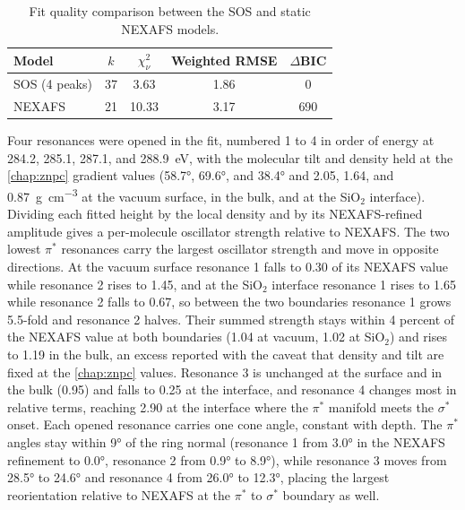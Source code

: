 \begin{table}
  \centering
  \caption{Fit quality comparison between the SOS and static NEXAFS models.}\label{tab:5.2}
  \begin{tabular}{l S[table-format=2.0] S[table-format=2.2] S[table-format=1.2] S[table-format=3.0]}
    \toprule
    Model & {\(k\)} & {\(\chi^{2}_{\nu}\)} & {Weighted RMSE} & {\(\Delta\)BIC} \\
    \midrule
    SOS (4 peaks) & 37 & 3.63 & 1.86 & 0 \\
    NEXAFS & 21 & 10.33 & 3.17 & 690 \\
    \bottomrule
  \end{tabular}
\end{table}

Four resonances were opened in the fit, numbered 1 to 4 in order of energy at 284.2, 285.1, 287.1, and \qty{288.9}{eV}, with the molecular tilt and density held at the \cref{chap:znpc} gradient values (\ang{58.7}, \ang{69.6}, and \ang{38.4} and 2.05, 1.64, and \qty{0.87}{g.cm^{-3}} at the vacuum surface, in the bulk, and at the SiO\(_{2}\) interface). Dividing each fitted height by the local density and by its NEXAFS-refined amplitude gives a per-molecule oscillator strength relative to NEXAFS. The two lowest \(\pi^{*}\) resonances carry the largest oscillator strength and move in opposite directions. At the vacuum surface resonance 1 falls to 0.30 of its NEXAFS value while resonance 2 rises to 1.45, and at the SiO\(_{2}\) interface resonance 1 rises to 1.65 while resonance 2 falls to 0.67, so between the two boundaries resonance 1 grows 5.5-fold and resonance 2 halves. Their summed strength stays within 4 percent of the NEXAFS value at both boundaries (1.04 at vacuum, 1.02 at SiO\(_{2}\)) and rises to 1.19 in the bulk, an excess reported with the caveat that density and tilt are fixed at the \cref{chap:znpc} values. Resonance 3 is unchanged at the surface and in the bulk (0.95) and falls to 0.25 at the interface, and resonance 4 changes most in relative terms, reaching 2.90 at the interface where the \(\pi^{*}\) manifold meets the \(\sigma^{*}\) onset. Each opened resonance carries one cone angle, constant with depth. The \(\pi^{*}\) angles stay within \ang{9} of the ring normal (resonance 1 from \ang{3.0} in the NEXAFS refinement to \ang{0.0}, resonance 2 from \ang{0.9} to \ang{8.9}), while resonance 3 moves from \ang{28.5} to \ang{24.6} and resonance 4 from \ang{26.0} to \ang{12.3}, placing the largest reorientation relative to NEXAFS at the \(\pi^{*}\) to \(\sigma^{*}\) boundary as well.

